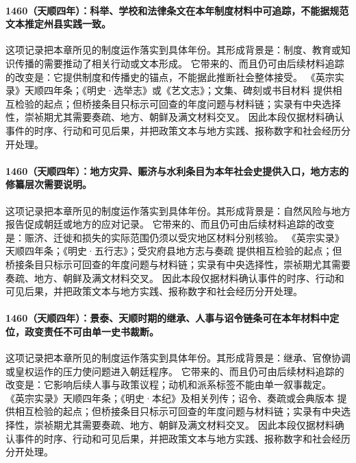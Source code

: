 \paragraph{1460（天顺四年）：科举、学校和法律条文在本年制度材料中可追踪，不能据规范文本推定州县实践一致。} 这项记录把本章所见的制度运作落实到具体年份。其形成背景是：制度、教育或知识传播的需要推动了相关行动或文本形成。 它带来的、而且仍可由后续材料追踪的改变是：它提供制度和传播史的锚点，不能据此推断社会整体接受。 《英宗实录》天顺四年条；《明史·选举志》或《艺文志》；文集、碑刻或书目材料 提供相互检验的起点；但桥接条目只标示可回查的年度问题与材料链；实录有中央选择性，崇祯期尤其需要奏疏、地方、朝鲜及满文材料交叉。 因此本段仅据材料确认事件的时序、行动和可见后果，并把政策文本与地方实践、报称数字和社会经历分开处理。

\paragraph{1460（天顺四年）：地方灾异、赈济与水利条目为本年社会史提供入口，地方志的修纂层次需要说明。} 这项记录把本章所见的制度运作落实到具体年份。其形成背景是：自然风险与地方报告促成朝廷或地方的应对记录。 它带来的、而且仍可由后续材料追踪的改变是：赈济、迁徙和损失的实际范围仍须以受灾地区材料分别核验。 《英宗实录》天顺四年条；《明史·五行志》；受灾府县地方志与奏疏 提供相互检验的起点；但桥接条目只标示可回查的年度问题与材料链；实录有中央选择性，崇祯期尤其需要奏疏、地方、朝鲜及满文材料交叉。 因此本段仅据材料确认事件的时序、行动和可见后果，并把政策文本与地方实践、报称数字和社会经历分开处理。

\paragraph{1460（天顺四年）：景泰、天顺时期的继承、人事与诏令链条可在本年材料中定位，政变责任不可由单一史书裁断。} 这项记录把本章所见的制度运作落实到具体年份。其形成背景是：继承、官僚协调或皇权运作的压力使问题进入朝廷程序。 它带来的、而且仍可由后续材料追踪的改变是：它影响后续人事与政策议程；动机和派系标签不能由单一叙事裁定。 《英宗实录》天顺四年条；《明史·本纪》及相关列传；诏令、奏疏或会典版本 提供相互检验的起点；但桥接条目只标示可回查的年度问题与材料链；实录有中央选择性，崇祯期尤其需要奏疏、地方、朝鲜及满文材料交叉。 因此本段仅据材料确认事件的时序、行动和可见后果，并把政策文本与地方实践、报称数字和社会经历分开处理。

